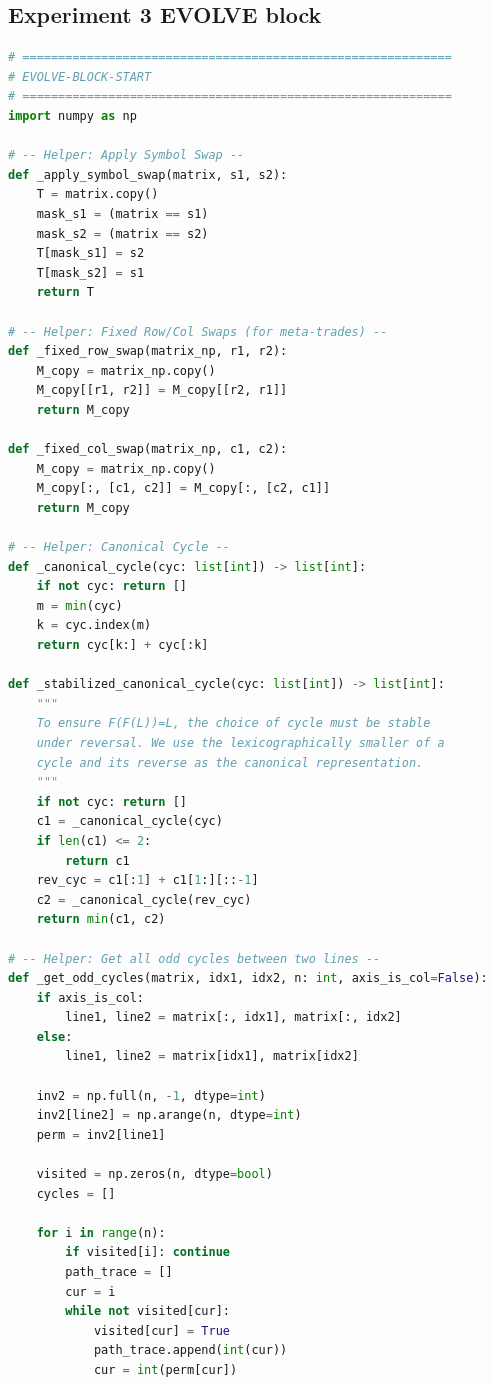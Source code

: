 \documentclass[11pt]{amsart}
\begin{document}
\subsection*{Experiment 3 EVOLVE block}
\begin{lstlisting}[language=Python]
# ============================================================
# EVOLVE-BLOCK-START
# ============================================================
import numpy as np

# -- Helper: Apply Symbol Swap --
def _apply_symbol_swap(matrix, s1, s2):
    T = matrix.copy()
    mask_s1 = (matrix == s1)
    mask_s2 = (matrix == s2)
    T[mask_s1] = s2
    T[mask_s2] = s1
    return T

# -- Helper: Fixed Row/Col Swaps (for meta-trades) --
def _fixed_row_swap(matrix_np, r1, r2):
    M_copy = matrix_np.copy()
    M_copy[[r1, r2]] = M_copy[[r2, r1]]
    return M_copy

def _fixed_col_swap(matrix_np, c1, c2):
    M_copy = matrix_np.copy()
    M_copy[:, [c1, c2]] = M_copy[:, [c2, c1]]
    return M_copy

# -- Helper: Canonical Cycle --
def _canonical_cycle(cyc: list[int]) -> list[int]:
    if not cyc: return []
    m = min(cyc)
    k = cyc.index(m)
    return cyc[k:] + cyc[:k]

def _stabilized_canonical_cycle(cyc: list[int]) -> list[int]:
    """
    To ensure F(F(L))=L, the choice of cycle must be stable
    under reversal. We use the lexicographically smaller of a
    cycle and its reverse as the canonical representation.
    """
    if not cyc: return []
    c1 = _canonical_cycle(cyc)
    if len(c1) <= 2:
        return c1
    rev_cyc = c1[:1] + c1[1:][::-1]
    c2 = _canonical_cycle(rev_cyc)
    return min(c1, c2)

# -- Helper: Get all odd cycles between two lines --
def _get_odd_cycles(matrix, idx1, idx2, n: int, axis_is_col=False):
    if axis_is_col:
        line1, line2 = matrix[:, idx1], matrix[:, idx2]
    else:
        line1, line2 = matrix[idx1], matrix[idx2]

    inv2 = np.full(n, -1, dtype=int)
    inv2[line2] = np.arange(n, dtype=int)
    perm = inv2[line1] 
    
    visited = np.zeros(n, dtype=bool)
    cycles = []

    for i in range(n):
        if visited[i]: continue
        path_trace = []
        cur = i
        while not visited[cur]:
            visited[cur] = True
            path_trace.append(int(cur))
            cur = int(perm[cur])
        

\end{lstlisting}
\end{document}
